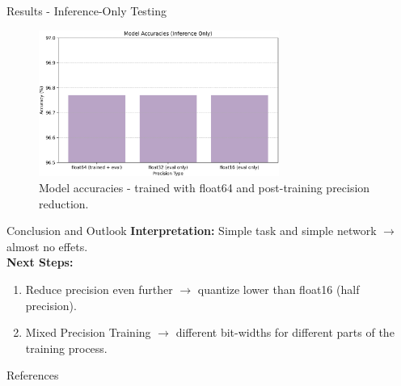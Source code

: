 \documentclass[aspectratio=169]{beamer} %
\begin{document}
\begin{frame}{Results - Inference-Only Testing}
  \begin{figure}
    \includegraphics[width=0.7\textwidth]{figures/inferenceOnly.png}
    \caption{Model accuracies - trained with float64 and post-training precision reduction.}
  \end{figure}
\end{frame}

\begin{frame}{Conclusion and Outlook}
  \textbf{Interpretation:} Simple task and simple network $\rightarrow$ almost no effets.\\
  \vspace{0.5cm}
  \textbf{Next Steps:}
  \begin{enumerate}
    \item Reduce precision even further $\rightarrow$ quantize lower than float16 (half
          precision).
    \item Mixed Precision Training $\rightarrow$ different bit-widths for different parts
          of the training process.
  \end{enumerate}
\end{frame}


\begin{skipframecount}
  \begin{frame}[allowframebreaks]{References}
    \printbibliography[heading=none]
  \end{frame}

  \appendix
\end{skipframecount}
\end{document}
